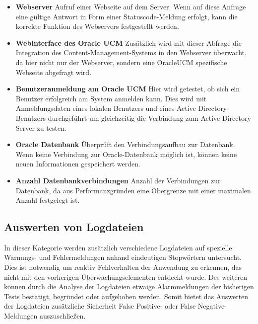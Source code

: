 \begin{itemize}
\item \textbf{Webserver} Aufruf einer Webseite auf dem Server. Wenn auf diese Anfrage eine gültige Antwort in Form einer Statuscode-Meldung erfolgt, kann die korrekte Funktion des Webservers festgestellt werden.

\item \textbf{Webinterface des Oracle UCM} Zusätzlich wird mit dieser Abfrage die Integration des Content-Management-Systems in den Webserver überwacht, da hier nicht nur der Webserver, sondern eine \gls{OracleUCM} spezifische Webseite abgefragt wird.

\item \textbf{Benutzeranmeldung am Oracle UCM} Hier wird getestet, ob sich ein Benutzer erfolgreich am System anmelden kann.
Dies wird mit Anmeldungsdaten eines lokalen Benutzers und eines Active Directory-Benutzers durchgeführt um gleichzeitig die Verbindung zum Active Directory-Server zu testen.

\item \textbf{Oracle Datenbank} Überprüft den Verbindungsaufbau zur Datenbank. Wenn keine Verbindung zur Oracle-Datenbank möglich ist, können keine neuen Informationen gespeichert werden. 


\item \textbf{Anzahl Datenbankverbindungen} Anzahl der Verbindungen zur Datenbank, da aus Performanzgründen eine Obergrenze mit einer maximalen Anzahl festgelegt ist.
\end{itemize}

\subsection{Auswerten von Logdateien}
\label{checklog}
In dieser Kategorie werden zusätzlich verschiedene Logdateien auf spezielle Warnungs- und Fehlermeldungen anhand eindeutigen Stopwörtern untersucht.
Dies ist notwendig um reaktiv Fehlverhalten der Anwendung zu erkennen, das nicht mit den vorherigen Überwachungselementen entdeckt wurde.
Des weiteren können durch die Analyse der Logdateien etwaige Alarmmeldungen der bisherigen Tests bestätigt, begründet oder aufgehoben werden.
Somit bietet das Auswerten der Logdateien zusätzliche Sicherheit False Positive- oder False Negative-Meldungen auszuschließen.

